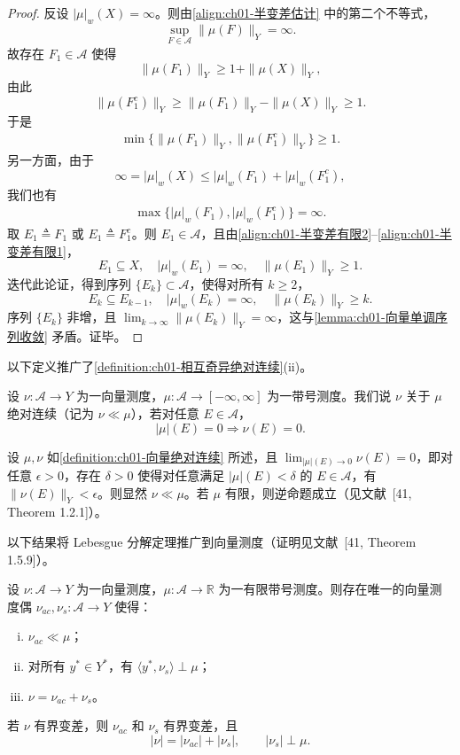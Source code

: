 \documentclass[../../main.tex]{subfiles}%
\begin{document}
\begin{proof}
反设 $|\mu|_w(X)=\infty$。则由\eqref{align:ch01-半变差估计} 中的第二个不等式，
\[
\sup_{F\in\mathcal{A}}\|\mu(F)\|_Y=\infty.
\]
故存在 $F_1\in\mathcal{A}$ 使得
\[
\|\mu(F_1)\|_Y\geqslant 1+\|\mu(X)\|_Y,
\]
由此
\[
\|\mu(F_1^c)\|_Y\geqslant\|\mu(F_1)\|_Y-\|\mu(X)\|_Y\geqslant 1.
\]
于是
\begin{align}
\min\{\|\mu(F_1)\|_Y,\|\mu(F_1^c)\|_Y\}\geqslant 1. \label{align:ch01-半变差有限1}
\end{align}
另一方面，由于
\[
\infty=|\mu|_w(X)\leqslant|\mu|_w(F_1)+|\mu|_w(F_1^c),
\]
我们也有
\begin{align}
\max\{|\mu|_w(F_1),|\mu|_w(F_1^c)\}=\infty. \label{align:ch01-半变差有限2}
\end{align}
取 $E_1\triangleq F_1$ 或 $E_1\triangleq F_1^c$。则 $E_1\in\mathcal{A}$，且由\eqref{align:ch01-半变差有限2}--\eqref{align:ch01-半变差有限1}，
\[
E_1\subseteq X,\quad |\mu|_w(E_1)=\infty,\quad\|\mu(E_1)\|_Y\geqslant 1.
\]
迭代此论证，得到序列 $\{E_k\}\subset\mathcal{A}$，使得对所有 $k\geqslant 2$，
\[
E_k\subseteq E_{k-1},\quad |\mu|_w(E_k)=\infty,\quad\|\mu(E_k)\|_Y\geqslant k.
\]
序列 $\{E_k\}$ 非增，且 $\lim_{k\to\infty}\|\mu(E_k)\|_Y=\infty$，这与\cref{lemma:ch01-向量单调序列收敛} 矛盾。证毕。
\end{proof}

以下定义推广了\cref{definition:ch01-相互奇异绝对连续}(ii)。

\begin{definition}\label{definition:ch01-向量绝对连续}
设 $\nu:\mathcal{A}\to Y$ 为一向量测度，$\mu:\mathcal{A}\to[-\infty,\infty]$ 为一带号测度。我们说 $\nu$ 关于 $\mu$ 绝对连续（记为 $\nu\ll\mu$），若对任意 $E\in\mathcal{A}$，
\[
|\mu|(E)=0\Rightarrow\nu(E)=0.
\]
\end{definition}

\begin{remark}\label{remark:ch01-向量绝对连续}
设 $\mu,\nu$ 如\cref{definition:ch01-向量绝对连续} 所述，且 $\lim_{|\mu|(E)\to0}\nu(E)=0$，即对任意 $\epsilon>0$，存在 $\delta>0$ 使得对任意满足 $|\mu|(E)<\delta$ 的 $E\in\mathcal{A}$，有 $\|\nu(E)\|_Y<\epsilon$。则显然 $\nu\ll\mu$。若 $\mu$ 有限，则逆命题成立（见文献~[41, Theorem 1.2.1]）。
\end{remark}

以下结果将 Lebesgue 分解定理推广到向量测度（证明见文献~[41, Theorem 1.5.9]）。

\begin{theorem}[Lebesgue 分解]\label{theorem:ch01-向量Lebesgue分解}
设 $\nu:\mathcal{A}\to Y$ 为一向量测度，$\mu:\mathcal{A}\to\mathbb{R}$ 为一有限带号测度。则存在唯一的向量测度偶 $\nu_{ac},\nu_s:\mathcal{A}\to Y$ 使得：
\begin{enumerate}[(i)]
\item $\nu_{ac}\ll\mu$；
\item 对所有 $y^*\in Y^*$，有 $\langle y^*,\nu_s\rangle\perp\mu$；
\item $\nu=\nu_{ac}+\nu_s$。
\end{enumerate}
若 $\nu$ 有界变差，则 $\nu_{ac}$ 和 $\nu_s$ 有界变差，且
\[
|\nu|=|\nu_{ac}|+|\nu_s|,\qquad |\nu_s|\perp\mu.
\]
\end{theorem}
\end{document}

